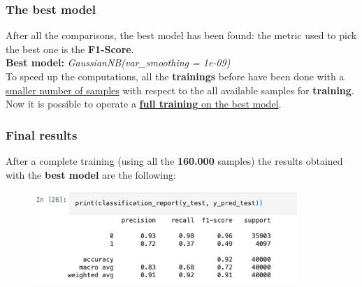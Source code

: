 \documentclass{beamer}
\begin{document}
\begin{frame}
\frametitle{The best model}
After all the comparisons, the best model has been found: the metric used to pick the best one is the \textbf{F1-Score}.
\newline\\
\textbf{Best model:} \textit{GaussianNB(var\_smoothing = 1e-09)}
\newline\\
To speed up the computations, all the \textbf{trainings} before have been done with a \underline{smaller number of samples} with respect to the all available samples for \textbf{training}. 
\newline\\
Now it is possible to operate a \underline{\textbf{full training} on the best model}.
\end{frame}

\begin{frame}
\frametitle{Final results}
After a complete training (using all the \textbf{160.000} samples) the results obtained with the \textbf{best model} are the following:
\begin{figure}
\centering
    \includegraphics[width=0.89\textwidth]{imgs/results.png}
    \label{fig:results}
\end{figure}
\end{frame}
\end{document}
